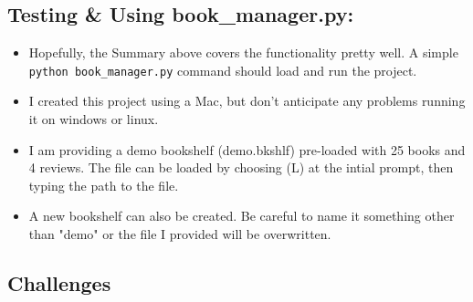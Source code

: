 \documentclass[11pt]{article}
\providecommand{\tightlist}{%
      \setlength{\itemsep}{0pt}\setlength{\parskip}{0pt}}
\begin{document}
\subsection{Testing \& Using
book\_manager.py:}\label{testing-using-book_manager.py}

\begin{itemize}
\tightlist
\item
  Hopefully, the Summary above covers the functionality pretty well. A
  simple \texttt{python\ book\_manager.py} command should load and run
  the project.
\item
  I created this project using a Mac, but don't anticipate any problems
  running it on windows or linux.
\item
  I am providing a demo bookshelf (demo.bkshlf) pre-loaded with 25 books
  and 4 reviews. The file can be loaded by choosing (L) at the intial
  prompt, then typing the path to the file.
\item
  A new bookshelf can also be created. Be careful to name it something
  other than "demo" or the file I provided will be overwritten.
\end{itemize}

\subsection{Challenges}\label{challenges}
\end{document}
